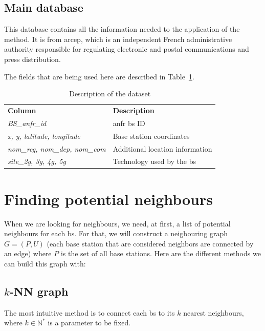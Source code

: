 \documentclass[lettersize,journal,english]{IEEEtran}
\begin{document}
    \subsection{Main database}

    This database \cite{main_database} contains all the information needed to the application of the method. It is from
    \acrfull{arcep}, which is an independent French administrative authority responsible for regulating electronic and postal communications and press distribution.

    The fields that are being used here are described in Table~\ref{data_columns}.

\begin{table}[!b]
    \centering
    \caption{Description of the dataset}
    \label{data_columns}
    \begin{tabular}{ll}
        \toprule
        \textbf{Column} & \textbf{Description} \\
        \cmidrule(lr){1-2}
        \textsl{BS\_anfr\_id} & \acrshort{anfr} \acrshort{bs} ID \\ 
        \textsl{x, y, latitude, longitude} & Base station coordinates \\ 
        \textsl{nom\_reg, nom\_dep, nom\_com} & Additional location information \\  
        \textsl{site\_2g, 3g, 4g, 5g} & Technology used by the \acrshort{bs} \\ 
        \bottomrule
    \end{tabular}
\end{table}

\section{Finding potential neighbours}
\noindent When we are looking for neighbours, we need, at first, a list of potential neighbours for each \acrfull{bs}.
For that, we will construct a neigbouring graph $G = (P, U)$ (each base station that are considered neighbors are
connected by an edge) where $P$ is the set of all base stations. 
Here are the different methods we can build this graph with:

\subsection{$k$-NN graph}
\noindent The most intuitive method is to connect each \acrshort{bs} to its $k$ nearest neighbours, where $k \in \mathbb{N}^*$ 
is a parameter to be fixed. 
\end{document}
